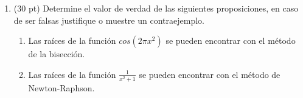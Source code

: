 \documentclass[11pt]{article}
\begin{document}
\begin{enumerate}

\item (30 pt) Determine el valor de verdad de las siguientes proposiciones, en caso de ser falsas justifique o muestre un contraejemplo.
\begin{enumerate}
\item
\fbox{ \begin{minipage}{1cm}   \hfill\vspace{1cm}   
    \end{minipage} } 
    \begin{minipage}{0.4\textwidth}
	Las ra\'ices de la funci\'on $cos(2\pi x^2)$ se pueden encontrar con el m\'etodo de la bisecci\'on.
    \end{minipage} 
    \begin{minipage}{0.4\textwidth}
   
    \end{minipage}
%
\item
\fbox{ \begin{minipage}{1cm}   \hfill\vspace{1cm}   		
    \end{minipage} } 
    \begin{minipage}{0.4\textwidth}
	Las ra\'ices de la funci\'on $\frac{1}{x^2+1}$ se pueden encontrar con el m\'etodo de Newton-Raphson.
    \end{minipage} 
    \begin{minipage}{0.4\textwidth}
    

\end{minipage}
\end{enumerate}
\end{enumerate}
\end{document}
